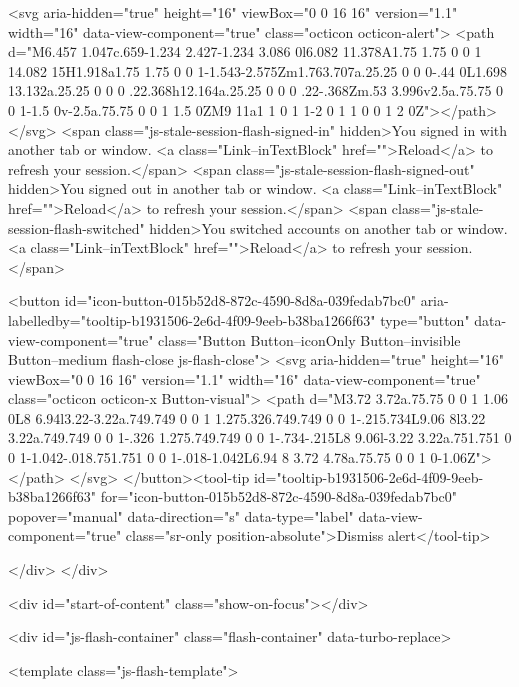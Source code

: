         <svg aria-hidden="true" height="16" viewBox="0 0 16 16" version="1.1" width="16" data-view-component="true" class="octicon octicon-alert">
    <path d="M6.457 1.047c.659-1.234 2.427-1.234 3.086 0l6.082 11.378A1.75 1.75 0 0 1 14.082 15H1.918a1.75 1.75 0 0 1-1.543-2.575Zm1.763.707a.25.25 0 0 0-.44 0L1.698 13.132a.25.25 0 0 0 .22.368h12.164a.25.25 0 0 0 .22-.368Zm.53 3.996v2.5a.75.75 0 0 1-1.5 0v-2.5a.75.75 0 0 1 1.5 0ZM9 11a1 1 0 1 1-2 0 1 1 0 0 1 2 0Z"></path>
</svg>
        <span class="js-stale-session-flash-signed-in" hidden>You signed in with another tab or window. <a class="Link--inTextBlock" href="">Reload</a> to refresh your session.</span>
        <span class="js-stale-session-flash-signed-out" hidden>You signed out in another tab or window. <a class="Link--inTextBlock" href="">Reload</a> to refresh your session.</span>
        <span class="js-stale-session-flash-switched" hidden>You switched accounts on another tab or window. <a class="Link--inTextBlock" href="">Reload</a> to refresh your session.</span>

    <button id="icon-button-015b52d8-872c-4590-8d8a-039fedab7bc0" aria-labelledby="tooltip-b1931506-2e6d-4f09-9eeb-b38ba1266f63" type="button" data-view-component="true" class="Button Button--iconOnly Button--invisible Button--medium flash-close js-flash-close">  <svg aria-hidden="true" height="16" viewBox="0 0 16 16" version="1.1" width="16" data-view-component="true" class="octicon octicon-x Button-visual">
    <path d="M3.72 3.72a.75.75 0 0 1 1.06 0L8 6.94l3.22-3.22a.749.749 0 0 1 1.275.326.749.749 0 0 1-.215.734L9.06 8l3.22 3.22a.749.749 0 0 1-.326 1.275.749.749 0 0 1-.734-.215L8 9.06l-3.22 3.22a.751.751 0 0 1-1.042-.018.751.751 0 0 1-.018-1.042L6.94 8 3.72 4.78a.75.75 0 0 1 0-1.06Z"></path>
</svg>
</button><tool-tip id="tooltip-b1931506-2e6d-4f09-9eeb-b38ba1266f63" for="icon-button-015b52d8-872c-4590-8d8a-039fedab7bc0" popover="manual" data-direction="s" data-type="label" data-view-component="true" class="sr-only position-absolute">Dismiss alert</tool-tip>


  
</div>
    </div>

  <div id="start-of-content" class="show-on-focus"></div>








    <div id="js-flash-container" class="flash-container" data-turbo-replace>




  <template class="js-flash-template">
    
